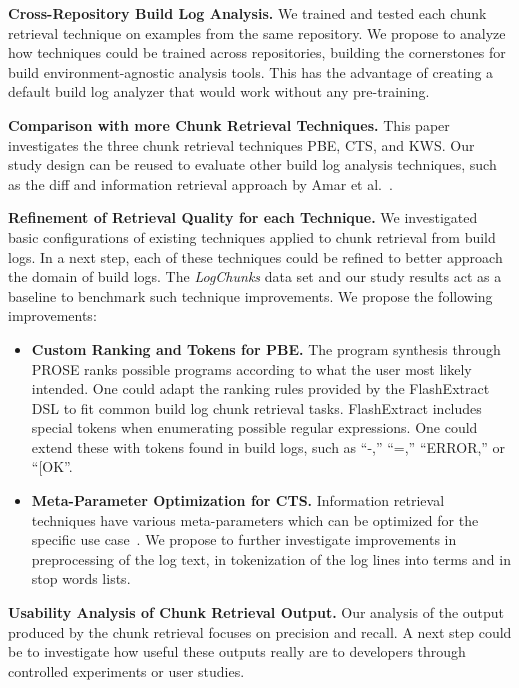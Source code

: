 \textbf{Cross-Repository Build Log Analysis.}
We trained and
tested each chunk retrieval technique on examples from the same
repository.
We propose to analyze how techniques could be trained
across repositories, building the cornerstones for build
environment-agnostic analysis tools.
This has the advantage of creating
a default build log analyzer that would work without any pre-training.

\textbf{Comparison with more Chunk Retrieval Techniques.}
This
paper investigates the three chunk retrieval techniques PBE, CTS, and
KWS\@.
Our study design can be reused to evaluate other build log
analysis techniques, such as the diff and information retrieval
approach by Amar et al.~\cite{amar2019mining}.

\textbf{Refinement of Retrieval Quality for each Technique.} We
investigated basic configurations of existing techniques applied to
chunk retrieval from build logs.
In a next step, each of these
techniques could be refined to better approach the domain of build
logs.
The \emph{LogChunks} data set and our study results act as a
baseline to benchmark such technique improvements.
We propose the
following improvements:
\begin{itemize}[leftmargin=0.4cm]
  \item \textbf{Custom Ranking and Tokens for PBE.} The program
  synthesis through PROSE ranks possible programs according to
  what the user most likely intended.
  One could adapt the ranking
  rules provided by the FlashExtract DSL to fit common build log
  chunk retrieval tasks.
  FlashExtract includes special tokens when
  enumerating possible regular expressions.
  One could extend these
  with tokens found in build logs, such as ``-,''
	``=,'' ``ERROR,''
  or ``[OK''.
  \item \textbf{Meta-Parameter Optimization for CTS.} Information
  retrieval techniques have various meta-parameters which can be
  optimized for the specific use
  case~\cite{panichella2016parameterizing}.
  We propose to further
  investigate improvements in preprocessing of the log text, in
  tokenization of the log lines into terms and in stop words
  lists.
\end{itemize}

\textbf{Usability Analysis of Chunk Retrieval Output.}
Our
analysis of the output produced by the chunk retrieval focuses on
precision and recall.
A next step could be to investigate how useful these
outputs really are to developers through controlled experiments or
user studies.

